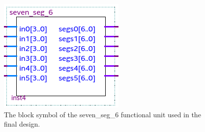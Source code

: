 \documentclass[a4paper]{article}
\begin{document}
\begin{figure}[h]
\centering
\includegraphics[width=.48\textwidth]{functional_units/seven_seg_6/seven_seg_6_symbol.png}
\caption{The block symbol of the seven\_seg\_6 functional unit used in the final design.}
\end{figure}
\end{document}
